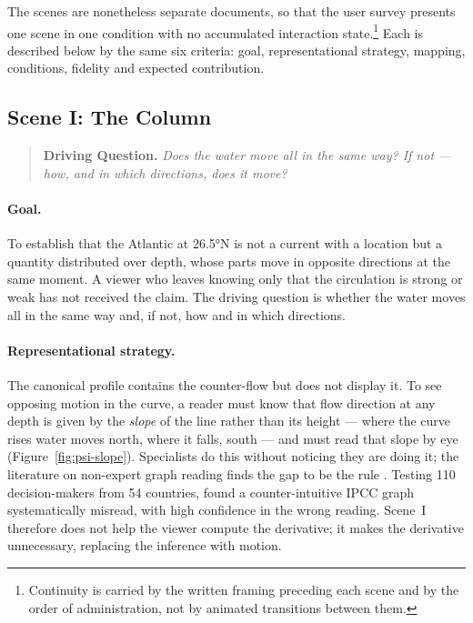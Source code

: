 The scenes are nonetheless separate documents, so that the user survey presents one scene in one condition with no accumulated interaction state.\footnote{Continuity is carried by the written framing preceding each scene and by the order of administration, not by animated transitions between them.} Each is described below by the same six criteria: goal, representational strategy, mapping, conditions, fidelity and expected contribution.
 
\subsection{Scene I: The Column}
\label{subsec:scene-column}

\begin{quote}
\textbf{Driving Question.} \emph{Does the water move all in the same way? If not — how, and in which directions, does it move?}
\end{quote}
 


\paragraph{Goal.} To establish that the Atlantic at 26.5°N is not a current with a location but a quantity distributed over depth, whose parts move in opposite directions at the same moment. A viewer who leaves knowing only that the circulation is strong or weak has not received the claim. The driving question is whether the water moves all in the same way and, if not, how and in which directions.
 
\paragraph{Representational strategy.} The canonical profile contains the counter-flow but does not display it. To see opposing motion in the curve, a reader must know that flow direction at any depth is given by the \emph{slope} of the line rather than its height --- where the curve rises water moves north, where it falls, south --- and must read that slope by eye (Figure~\ref{fig:psi-slope}). Specialists do this without noticing they are doing it; the literature on non-expert graph reading finds the gap to be the rule \parencite{harold2016,mcmahon2015}. Testing 110 decision-makers from 54 countries, \textcite{fischer2020} found a counter-intuitive IPCC graph systematically misread, with high confidence in the wrong reading. Scene~I therefore does not help the viewer compute the derivative; it makes the derivative unnecessary, replacing the inference with motion.
 
